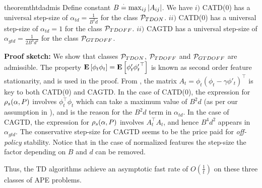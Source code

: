 \begin{restatable}{theorem}{thtdadmis}\label{th:tdadmis}
Define constant $B\eqdef\max_{ij}\md{A_{ij}}$.  We have 
$i)$ CATD(0) has a universal step-size of $\alpha_{td}=\frac{1}{B^2d}$ for  the class $\P_{TDON}$.
$ii)$ CATD(0) has a universal step-size of $\alpha_{td}=1$ for  the class $\P_{TDOFF}$.
$ii)$ CAGTD has a universal step-size of $\alpha_{gtd}=\frac{1}{2B^4d^2}$ for the class $\P_{GTDOFF}$.
\end{restatable}
\textbf{Proof sketch:} We show that classes $\P_{TDON}$, $\P_{TDOFF}$ and $\P_{GTDOFF}$ are admissible. The property $\EE{\phi_t\phi_t}=\EE{\phi'_t{\phi'_t}^\top}$ is known as second order feature stationarity, and is used in the proof.
 From , the matrix $A_t=\phi_t(\phi_t-\gamma\phi'_t)^\top$ is key to both CATD(0) and CAGTD. In the case of CATD(0),  the expression for $\rhos{P}$ involves $\phi^\top_t\phi_t$ which can take a maximum value of $B^2d$ (as per our assumption in ), and is the reason for the $B^2d$ term in $\alpha_{td}$. In the case of CAGTD, the expression for $\rhos{P}$ involves $A_t^\top A_t$, and hence $B^4d^2$ appears in $\alpha_{gtd}$. The conservative step-size for CAGTD seems to be the price paid for \emph{off-policy} stability. Notice that in the case of normalized features the step-size the factor depending on $B$ and $d$ can be removed.

Thus, the TD algorithms achieve an asymptotic fast rate of $O(\frac{1}{t})$ on these three classes of APE problems.

